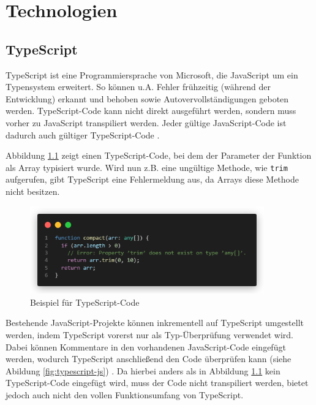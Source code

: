 \chapter{Technologien}

%
%
\section{TypeScript}

TypeScript ist eine Programmiersprache von Microsoft, die JavaScript um ein Typensystem erweitert. So können u.A. Fehler frühzeitig (während der Entwicklung) erkannt und behoben sowie Autovervollständigungen geboten werden. TypeScript-Code kann nicht direkt ausgeführt werden, sondern muss vorher zu JavaScript transpiliert werden. Jeder gültige JavaScript-Code ist dadurch auch gültiger TypeScript-Code \cites[vgl.][]{TypeScript}[vgl.][]{TypeScriptForJSDevelopers}.

Abbildung \ref{fig:typescript} zeigt einen TypeScript-Code, bei dem der Parameter der Funktion als Array typisiert wurde. Wird nun z.B. eine ungültige Methode, wie \lstinline{trim} aufgerufen, gibt TypeScript eine Fehlermeldung aus, da Arrays diese Methode nicht besitzen.

\begin{figure}[H]
  \includegraphics[width=0.9\textwidth]{images/typescript-example.png}
  \centering
  \caption[Beispiel für TypeScript-Code]{Beispiel für TypeScript-Code}
  \label{fig:typescript}
\end{figure}

Bestehende JavaScript-Projekte können inkrementell auf TypeScript umgestellt werden, indem TypeScript vorerst nur als Typ-Überprüfung verwendet wird. Dabei können Kommentare in den vorhandenen JavaScript-Code eingefügt werden, wodurch TypeScript anschließend den Code überprüfen kann (siehe Abildung \ref{fig:typescript-js}) \cite[vgl.][]{TypeScript}. Da hierbei anders als in Abbildung \ref{fig:typescript} kein TypeScript-Code eingefügt wird, muss der Code nicht transpiliert werden, bietet jedoch auch nicht den vollen Funktionsumfang von TypeScript.

